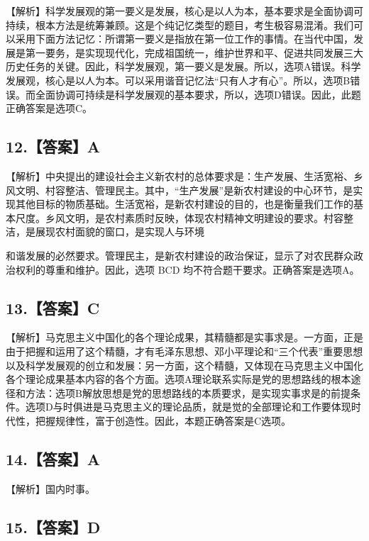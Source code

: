 \documentclass[UTF8,11pt]{ctexart}
\begin{document}
【解析】科学发展观的第一要义是发展，核心是以人为本，基本要求是全面协调可持续，根本方法是统筹兼顾。这是个纯记忆类型的题目，考生极容易混淆。我们可以采用下面方法记忆：所谓第一要义是指放在第一位工作的事情。在当代中国，发展是第一要务，是实现现代化，完成祖国统一，维护世界和平、促进共同发展三大历史任务的关键。因此，科学发展观，第一要义是发展。所以，选项A错误。科学发展观，核心是以人为本。可以采用谐音记忆法“只有人才有心”。所以，选项B错误。而全面协调可持续是科学发展观的基本要求，所以，选项D错误。因此，此题正确答案是选项C。


\subsection*{12.【答案】A}

【解析】中央提出的建设社会主义新农村的总体要求是：生产发展、生活宽裕、乡风文明、村容整洁、管理民主。其中，“生产发展”是新农村建设的中心环节，是实现其他目标的物质基础。生活宽裕，是新农村建设的目的，也是衡量我们工作的基本尺度。乡风文明，是农村素质时反映，体现农村精神文明建设的要求。村容整洁，是展现农村面貌的窗口，是实现人与环境


和谐发展的必然要求。管理民主，是新农村建设的政治保证，显示了对农民群众政治权利的尊重和维护。因此，选项 BCD 均不符合题干要求。正确答案是选项A。


\subsection*{13.【答案】C}

【解析】马克思主义中国化的各个理论成果，其精髓都是实事求是。一方面，正是由于把握和运用了这个精髓，才有毛泽东思想、邓小平理论和“三个代表”重要思想以及科学发展观的创立和发展：另一方面，这个精髓，又体现在马克思主义中国化各个理论成果基本内容的各个方面。选项A理论联系实际是党的思想路线的根本途径和方法：选项B解放思想是党的思想路线的本质要求，是实现实事求是的前提条件。选项D与时俱进是马克思主义的理论品质，就是觉的全部理论和工作要体现时代性，把握规律性，富于创造性。因此，本题正确答案是C选项。


\subsection*{14.【答案】A}

【解析】国内时事。


\subsection*{15.【答案】D}
\end{document}
